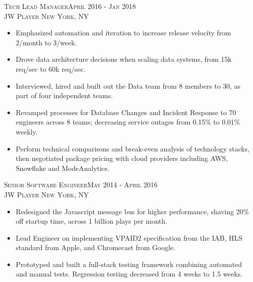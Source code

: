 \documentclass[oneside, final]{scrartcl}
\begin{document}
\begin{center}
\textsc{Tech Lead Manager\hfill April 2016 - Jan 2018\\}
\textsc{JW Player \hfill New York, NY\\}
\begin{itemize}
	\setlength{\itemsep}{1pt}
	\setlength{\parskip}{0pt}
	\setlength{\parsep}{0pt}
	\setlength{\leftmargin}{-5mm}
	\item Emphasized automation and iteration to increase release velocity from 2/month to 3/week.
	\item Drove data architecture decisions when scaling data systems, from 15k req/sec to 60k req/sec.
	\item Interviewed, hired and built out the Data team from 8 members to 30, as part of four independent teams.
	\item Revamped processes for Database Changes and Incident Response to 70 engineers across 8 teams; decreasing service outages from 0.15\% to 0.01\% weekly.
	\item Perform technical comparisons and break-even analysis of technology stacks, then negotiated package pricing with cloud providers including AWS, Snowflake and ModeAnalytics.
\end{itemize}

\textsc{Senior Software Engineer\hfill May 2014 - April 2016\\}
\textsc{JW Player \hfill New York, NY\\}
\begin{itemize}
	\setlength{\itemsep}{1pt}
	\setlength{\itemsep}{1pt}
	\setlength{\parskip}{0pt}
	\setlength{\parsep}{0pt}
	\setlength{\leftmargin}{-5mm}
        \item Redesigned the Javascript message bus for higher performance, shaving 20\% off startup time, across 1 billion plays per month.
        \item Lead Engineer on implementing VPAID2 specification from the IAB, HLS standard from Apple, and Chromecast from Google.
        \item Prototyped and built a full-stack testing framework combining automated and manual tests. Regression testing decreased from 4 weeks to 1.5 weeks.
\end{itemize}


\end{center}
\end{document}
